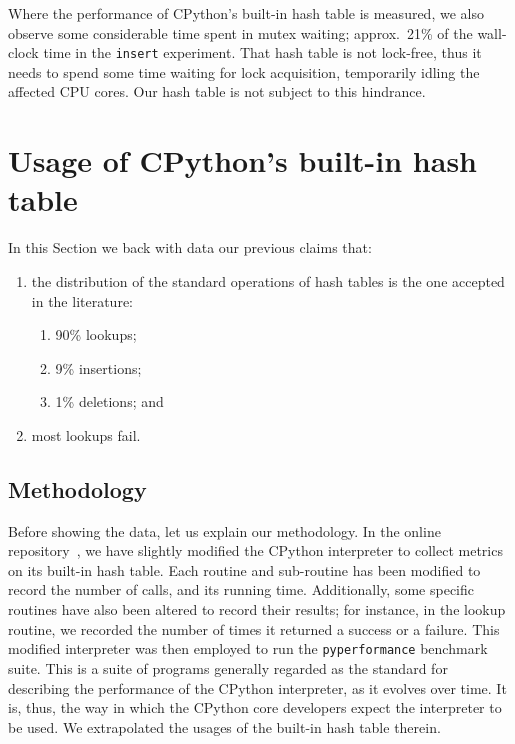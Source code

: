 Where the performance of CPython's built-in hash table is measured, we also observe some considerable time spent in mutex waiting; approx.\ 21\% of the wall-clock time in the \texttt{insert} experiment.
That hash table is not lock-free, thus it needs to spend some time waiting for lock acquisition, temporarily idling the affected CPU cores.
Our hash table is not subject to this hindrance.


\section{Usage of CPython's built-in hash table}\label{sec:dict-metrics}

In this Section we back with data our previous claims that:
\begin{enumerate}
    \item the distribution of the standard operations of hash tables is the one accepted in the literature:
    \begin{enumerate}
        \item 90\% lookups;
        \item 9\% insertions;
        \item 1\% deletions; and
    \end{enumerate}
    \item most lookups fail.
\end{enumerate}

\subsection{Methodology}\label{subsec:dict-metrics-methodology}

Before showing the data, let us explain our methodology.
In the online repository~\cite{dict-metrics}, we have slightly modified the CPython interpreter to collect metrics on its built-in hash table.
Each routine and sub-routine has been modified to record the number of calls, and its running time.
Additionally, some specific routines have also been altered to record their results; for instance, in the lookup routine, we recorded the number of times it returned a success or a failure.
This modified interpreter was then employed to run the \texttt{pyperformance} benchmark suite.
This is a suite of programs generally regarded as the standard for describing the performance of the CPython interpreter, as it evolves over time.
It is, thus, the way in which the CPython core developers expect the interpreter to be used.
We extrapolated the usages of the built-in hash table therein.

